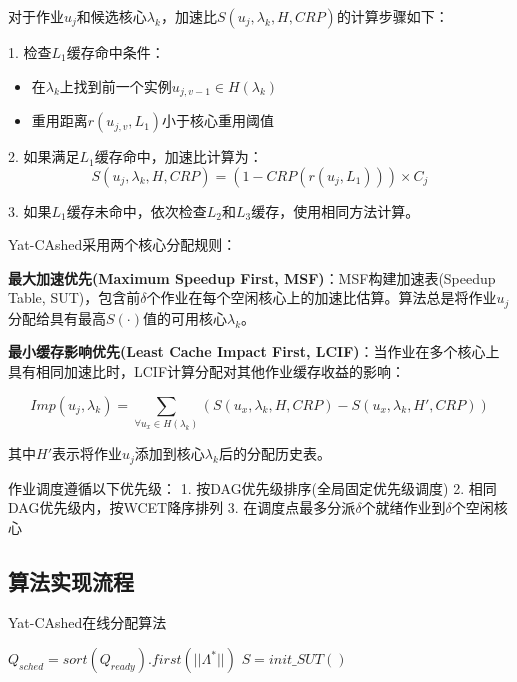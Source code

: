 对于作业$u_j$和候选核心$\lambda_k$，加速比$S(u_j, \lambda_k, H, CRP)$的计算步骤如下：

1. 检查$L_1$缓存命中条件：
   \begin{itemize}
       \item 在$\lambda_k$上找到前一个实例$u_{j,v-1} \in H(\lambda_k)$
       \item 重用距离$r(u_{j,v}, L_1)$小于核心重用阈值
   \end{itemize}

2. 如果满足$L_1$缓存命中，加速比计算为：
   $$S(u_j, \lambda_k, H, CRP) = (1 - CRP(r(u_j, L_1))) \times C_j$$

3. 如果$L_1$缓存未命中，依次检查$L_2$和$L_3$缓存，使用相同方法计算。

Yat-CAshed采用两个核心分配规则：

\textbf{最大加速优先(Maximum Speedup First, MSF)}：MSF构建加速表(Speedup Table, SUT)，包含前$\delta$个作业在每个空闲核心上的加速比估算。算法总是将作业$u_j$分配给具有最高$S(\cdot)$值的可用核心$\lambda_k$。

\textbf{最小缓存影响优先(Least Cache Impact First, LCIF)}：当作业在多个核心上具有相同加速比时，LCIF计算分配对其他作业缓存收益的影响：

$$Imp(u_j, \lambda_k) = \sum_{\forall u_x \in H(\lambda_k)} (S(u_x, \lambda_k, H, CRP) - S(u_x, \lambda_k, H', CRP))$$

其中$H'$表示将作业$u_j$添加到核心$\lambda_k$后的分配历史表。

作业调度遵循以下优先级：
1. 按DAG优先级排序(全局固定优先级调度)
2. 相同DAG优先级内，按WCET降序排列
3. 在调度点最多分派$\delta$个就绪作业到$\delta$个空闲核心

\subsection{算法实现流程}

\begin{algorithm}[H]
\SetAlgoLined
\caption{Yat-CAshed在线分配算法}
$Q_{sched} = sort(Q_{ready}).first(||\Lambda^*||)$\;
$S = init\_SUT()$\;
\end{algorithm}

